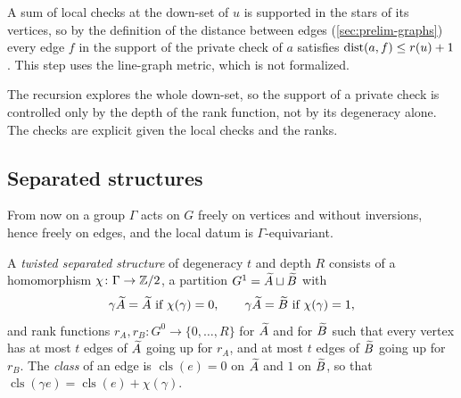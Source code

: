 A sum of local checks at the down-set of $u$ is supported in the stars of its vertices, so by the definition of the
distance between edges (\cref{sec:prelim-graphs}) every edge $f$ in the support of the private check of $a$ satisfies
$\operatorname{dist}(a,f)\le r(u)+1$. This step uses the line-graph metric, which is not formalized.

The recursion explores the whole down-set, so the support of a private check is controlled only by the depth of the
rank function, not by its degeneracy alone. The checks are explicit given the local checks and the ranks.

\subsection{Separated structures}\label{sec:peeling-structure}

From now on a group $\Gamma$ acts on $G$ freely on vertices and without inversions, hence freely on edges, and the local
datum is $\Gamma$-equivariant.

\begin{definition}\label{def:structure}
A \emph{twisted separated structure} of degeneracy $t$ and depth $R$ consists of a homomorphism $\chi\colon\Gamma\to\mathbb{Z}/2$,
a partition $G^1=\widetilde A\sqcup\widetilde B$ with
\[
  \gamma\Ftil A=\Ftil A\ \text{if}\ \chi(\gamma)=0,\qquad \gamma\Ftil A=\Ftil B\ \text{if}\ \chi(\gamma)=1,
\]
and rank functions $r_A,r_B\colon G^0\to\{0,\dots,R\}$ for $\widetilde A$ and for $\widetilde B$ such that every vertex has at most
$t$ edges of $\widetilde A$ going up for $r_A$, and at most $t$ edges of $\widetilde B$ going up for~$r_B$. The \emph{class} of an
edge is $\operatorname{cls}(e)=0$ on $\widetilde A$ and $1$ on $\widetilde B$, so that
$\operatorname{cls}(\gamma e)=\operatorname{cls}(e)+\chi(\gamma)$.
\end{definition}

